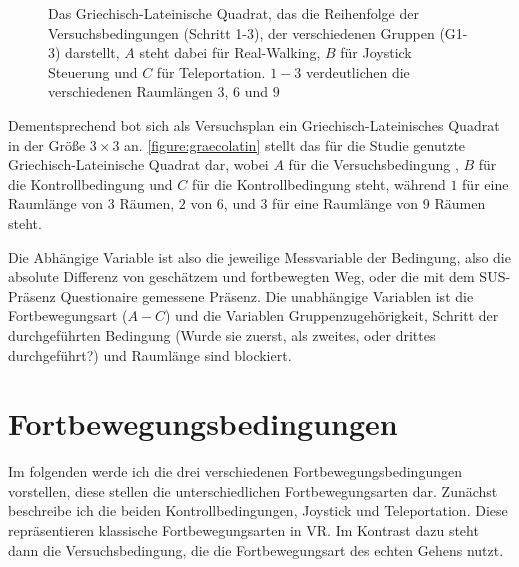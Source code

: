     \begin{figure}[!h]
        \centering
        

        \caption{Das Griechisch-Lateinische Quadrat, das die Reihenfolge der Versuchsbedingungen (Schritt 1-3), der verschiedenen Gruppen (G1-3) darstellt, $A$ steht dabei für Real-Walking, $B$ für Joystick Steuerung und $C$ für Teleportation. $1-3$ verdeutlichen die verschiedenen Raumlängen $3$, $6$ und $9$}\label{figure:graecolatin}
    \end{figure}

    Dementsprechend bot sich als Versuchsplan ein Griechisch-Lateinisches Quadrat in der Größe $3 \times 3$ an. \autoref{figure:graecolatin} stellt das für die Studie genutzte Griechisch-Lateinische Quadrat dar, wobei $A$ für die Versuchsbedingung , $B$ für die Kontrollbedingung  und $C$ für die Kontrollbedingung  steht, während $1$ für eine Raumlänge von 3 Räumen, $2$ von 6, und $3$ für eine Raumlänge von 9 Räumen steht.

    Die Abhängige Variable ist also die jeweilige Messvariable der Bedingung, also die absolute Differenz von geschätzem und fortbewegten Weg, oder die mit dem SUS-Präsenz Questionaire gemessene Präsenz. Die unabhängige Variablen ist die Fortbewegungsart ($A-C$) und die Variablen Gruppenzugehörigkeit, Schritt der durchgeführten Bedingung (Wurde sie zuerst, als zweites, oder drittes durchgeführt?) und Raumlänge sind blockiert. %

    \section{Fortbewegungsbedingungen}\label{sec:conditions}
        Im folgenden werde ich die drei verschiedenen Fortbewegungsbedingungen vorstellen, diese stellen die unterschiedlichen Fortbewegungsarten dar. Zunächst beschreibe ich die beiden Kontrollbedingungen, Joystick und Teleportation. Diese repräsentieren klassische Fortbewegungsarten in VR. Im Kontrast dazu steht dann die Versuchsbedingung, die die Fortbewegungsart des echten Gehens nutzt. %

